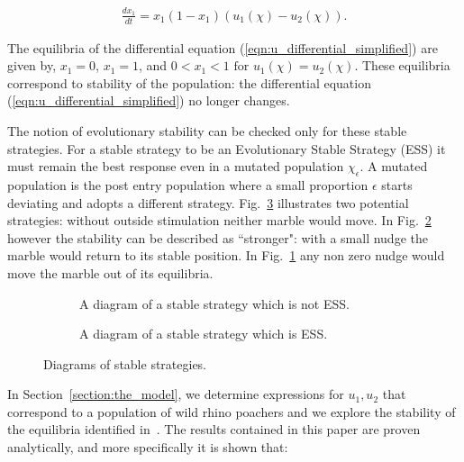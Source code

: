 \documentclass[10pt]{article}
\begin{document}
\begin{eqnarray}
    \label{eqn:u_differential_simplified}
    \frac{dx_1}{dt}= x_1(1 - x_1)(u_1(\chi) - u_2(\chi)).
\end{eqnarray}

The equilibria of the differential equation (\ref{eqn:u_differential_simplified})
are given by, \(x_1=0\), \(x_1=1\), and \(0<x_1<1 \mbox{ for } u_1(\chi)=u_2(\chi)\).
These equilibria correspond to stability of the population: the differential 
equation (\ref{eqn:u_differential_simplified}) no longer changes. 

The notion of evolutionary stability can be checked only for these stable strategies.
For a stable strategy to be an Evolutionary Stable Strategy (ESS) it must remain
the best response even in a mutated population \(\chi_\epsilon\). A mutated population
is the post entry population 
where a small proportion \(\epsilon\) starts deviating and adopts a different strategy.
Fig.~\ref{fig:stable_ess_driagrams} illustrates two potential strategies: without
outside stimulation neither marble would move. In Fig.~\ref{fig:ess_diagram}
however the stability can be described as ``stronger": with a small nudge the marble
would return to its stable position. In Fig.~\ref{fig:stable_diagram} any non zero
nudge would move the marble out of its equilibria.

\begin{figure}[!htbp]
\begin{center}
    \begin{subfigure}{0.40\textwidth}
    
    \caption{\label{fig:stable_diagram} A diagram of a stable strategy which 
    is not ESS.}
    \end{subfigure}
    \begin{subfigure}{0.40\textwidth}
    
    \caption{\label{fig:ess_diagram}A diagram of a stable strategy which is ESS.}
    \end{subfigure}
        \caption{\label{fig:stable_ess_driagrams} Diagrams of stable strategies.}
\end{center}
\end{figure}

In Section~\ref{section:the_model}, we determine expressions
for \(u_1, u_2\) that correspond to a population of wild rhino poachers and we
explore the stability of the equilibria identified in~\cite{Lee}. The results
contained in this paper are proven analytically, and more specifically it is 
shown that:
\end{document}
